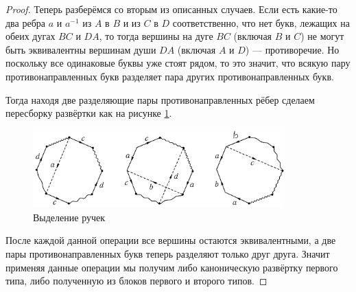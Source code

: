 \documentclass[12pt,a4paper]{article}
\begin{document}
\begin{proof}
        Теперь разберёмся со вторым из описанных случаев. Если есть какие-то два ребра $a$ и $a^{-1}$ из $A$ в $B$ и из $C$ в $D$ соответственно, что нет букв, лежащих на обеих дугах $BC$ и $DA$, то тогда вершины на дуге $BC$ (включая $B$ и $C$) не могут быть эквивалентны вершинам души $DA$ (включая $A$ и $D$) --- противоречие. Но поскольку все одинаковые буквы уже стоят рядом, то это значит, что всякую пару противонаправленных букв разделяет пара других противонаправленных букв.

        Тогда находя две разделяющие пары противонаправленных рёбер сделаем пересборку развёртки как на рисунке \ref{surface_typisation_picture_5}.
        \begin{figure}[h]
            \centering
            \includegraphics[height=3cm]{GaT-3.png}
            \caption{Выделение ручек}
            \label{surface_typisation_picture_5}
        \end{figure}
        После каждой данной операции все вершины остаются эквивалентными, а две пары противонаправленных букв теперь разделяют только друг друга. Значит применяя данные операции мы получим либо каноническую развёртку первого типа, либо полученную из блоков первого и второго типов.


\end{proof}
\end{document}
